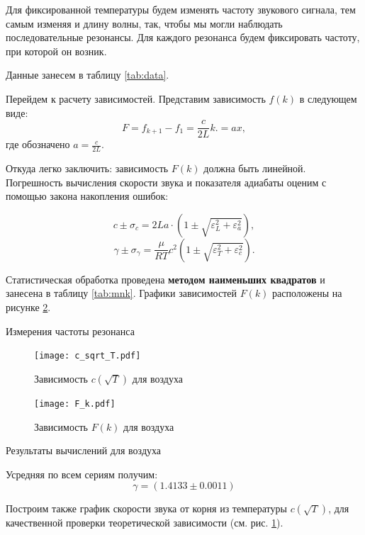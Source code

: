 \documentclass[12pt,a4paper]{article}
\begin{document}
Для фиксированной температуры будем изменять частоту звукового сигнала, тем самым изменяя и длину волны, так, чтобы мы могли наблюдать последовательные резонансы. Для каждого резонанса будем фиксировать частоту, при которой он возник. 

Данные занесем в таблицу \ref{tab:data}.

Перейдем к расчету зависимостей. Представим зависимость $f(k)$ в следующем виде:
$$F = f_{k+1} - f_1= \frac{c}{2L}k. = ax,$$
где обозначено $a = \frac{c}{2L}$.

Откуда легко заключить: зависимость $F(k)$ должна быть линейной.
Погрешность вычисления скорости звука и показателя адиабаты оценим с помощью закона накопления ошибок:


$$c \pm \sigma_c = 2La \cdot \left(1 \pm \sqrt{\varepsilon_L^2 + \varepsilon_a^2}\right),$$
$$\gamma \pm \sigma_\gamma=\frac{\mu}{RT} c^2 \left(1 \pm \sqrt{\varepsilon_T^2 + \varepsilon_c^2}\right).$$


Статистическая обработка проведена \textbf{методом наименьших квадратов} и занесена в таблицу \ref{tab:mnk}.
Графики зависимостей $F(k)$ расположены на рисунке \ref{fig:fk}.

\begin{table}[H]
	\caption{Измерения частоты резонанса}
	\label{tab:data}
	
\end{table}

\begin{figure}[H]
	\texttt{[image: c\_sqrt\_T.pdf]}
	\caption{Зависимость $c(\sqrt{T})$ для воздуха}
	\label{fig:ct}
\end{figure}

		
\begin{figure}[H]
	\texttt{[image: F\_k.pdf]}
	\caption{Зависимость $F(k)$ для воздуха}
	\label{fig:fk}
\end{figure}

\begin{table}[H]
	\caption{Результаты вычислений для воздуха}
	\label{tab:mnk}
	
\end{table}



Усредняя по всем сериям получим:
$$\gamma = (1.4133 \pm 0.0011)$$



Построим также график скорости звука от корня из температуры $c(\sqrt{T})$, для качественной проверки теоретической зависимости (см. рис. \ref{fig:ct}).
\end{document}
